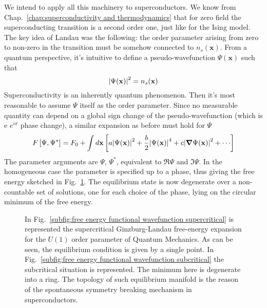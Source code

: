 We intend to apply all this machinery to superconductors. We know from Chap.~\ref{chap:superconductivity and thermodynamics} that for zero field the superconducting transition is a second order one, just like for the Ising model. The key idea of Landau was the following: the order parameter arising from zero to non-zero in the transition must be somehow connected to $n_s(\mathbf{x})$. From a quantum perspective, it's intuitive to define a pseudo-wavefunction $\Psi(\mathbf{x})$ such that
\[
    \abs{\Psi(\mathbf{x})}^2 = n_s (\mathbf{x})
\]
Superconductivity is an inherently quantum phenomenon. Then it's most reasonable to assume $\Psi$ itself as the order parameter. Since no measurable quantity can depend on a global sign change of the pseudo-wavefunction (which is e $e^{i\pi}$ phase change), a similar expansion as before must hold for $\Psi$
\[ 
    F\left[{\Psi,\Psi^*}\right] = F_0 + \int d\mathbf{x} \left[{
        a \abs{\Psi(\mathbf{x)} }^2 + \frac{b}{2} \abs{ \Psi(\mathbf{x)} }^4 + c \abs{\grad \Psi(\mathbf{x)} }^2 + \cdots
    }\right]
\]
The parameter arguments are $\Psi$, $\Psi^*$, equivalent to $\Re{\Psi}$ and $\Im{\Psi}$. In the homogeneous case the parameter is specified up to a phase, thus giving the free energy sketched in Fig.~\ref{fig:free energy functional wavefunction}. The equilibrium state is now degenerate over a non-countable set of solutions, one for each choice of the phase, lying on the circular minimum of the free energy.

\begin{figure}
    \centering
    \caption{In Fig.~\ref{subfig:free energy functional wavefunction supercritical} is represented the supercritical Ginzburg-Landau free-energy expansion for the $U(1)$ order parameter of Quantum Mechanics. As can be seen, the equilibrium condition is given by a single point. In Fig.~\ref{subfig:free energy functional wavefunction subcritical} the subcritical situation is represented. The minimum here is degenerate into a ring. The topology of such equilibrium manifold is the reason of the spontaneous symmetry breaking mechanism in superconductors.}
    \label{fig:free energy functional wavefunction}
\end{figure}

